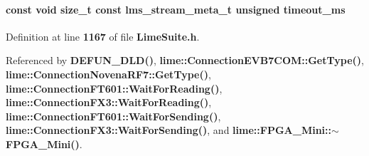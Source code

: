 \paragraph[{timeout\+\_\+ms}]{\setlength{\rightskip}{0pt plus 5cm}const {\bf void} size\+\_\+t const {\bf lms\+\_\+stream\+\_\+meta\+\_\+t} unsigned timeout\+\_\+ms}\label{group__FN__STREAM_ga99d39cc472ce807b89adc26e7deea42e}


Definition at line {\bf 1167} of file {\bf Lime\+Suite.\+h}.



Referenced by {\bf D\+E\+F\+U\+N\+\_\+\+D\+L\+D()}, {\bf lime\+::\+Connection\+E\+V\+B7\+C\+O\+M\+::\+Get\+Type()}, {\bf lime\+::\+Connection\+Novena\+R\+F7\+::\+Get\+Type()}, {\bf lime\+::\+Connection\+F\+T601\+::\+Wait\+For\+Reading()}, {\bf lime\+::\+Connection\+F\+X3\+::\+Wait\+For\+Reading()}, {\bf lime\+::\+Connection\+F\+T601\+::\+Wait\+For\+Sending()}, {\bf lime\+::\+Connection\+F\+X3\+::\+Wait\+For\+Sending()}, and {\bf lime\+::\+F\+P\+G\+A\+\_\+\+Mini\+::$\sim$\+F\+P\+G\+A\+\_\+\+Mini()}.

